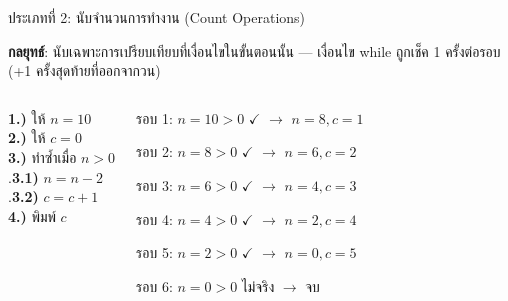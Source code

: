 \documentclass[11pt, aspectratio=169]{beamer}
\begin{document}
\begin{frame}{ประเภทที่ 2: นับจำนวนการทำงาน (Count Operations)}
  \begin{explanation}
    \textbf{กลยุทธ์}: นับเฉพาะการเปรียบเทียบที่เงื่อนไขในขั้นตอนนั้น —
    เงื่อนไข while ถูกเช็ค 1 ครั้งต่อรอบ (+1 ครั้งสุดท้ายที่ออกจากวน)
  \end{explanation}

  \begin{columns}[T]
      \begin{pseudobox}
        \textbf{1.)} ให้ $n = 10$ \\
        \textbf{2.)} ให้ $c = 0$ \\
        \textbf{3.)} ทำซํ้าเมื่อ $n > 0$ \\
        .\qquad \textbf{3.1)} $n = n - 2$ \\
        .\qquad \textbf{3.2)} $c = c + 1$ \\
        \textbf{4.)} พิมพ์ $c$
      \end{pseudobox}
      \begin{solbox}
        รอบ 1: $n=10 > 0$ $\checkmark$ $\rightarrow$ $n=8, c=1$

        รอบ 2: $n=8 > 0$ $\checkmark$ $\rightarrow$ $n=6, c=2$

        รอบ 3: $n=6 > 0$ $\checkmark$ $\rightarrow$ $n=4, c=3$

        รอบ 4: $n=4 > 0$ $\checkmark$ $\rightarrow$ $n=2, c=4$

        รอบ 5: $n=2 > 0$ $\checkmark$ $\rightarrow$ $n=0, c=5$

        รอบ 6: $n=0 > 0$ ไม่จริง $\rightarrow$ จบ

      \end{solbox}
  \end{columns}
\end{frame}
\end{document}

